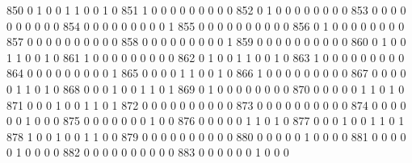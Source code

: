 \documentclass[compress,8pt]{beamer}
\begin{document}
\begin{frame}
\begin{Schunk}
  850      0       1   0              0        1    1       0       0   1   0
  851      1       0   0              0        0    0       0       0   0   0
  852      0       1   0              0        0    0       0       0   0   0
  853      0       0   0              0        0    0       0       0   0   0
  854      0       0   0              0        0    0       0       0   0   1
  855      0       0   0              0        0    0       0       0   0   0
  856      0       1   0              0        0    0       0       0   0   0
  857      0       0   0              0        0    0       0       0   0   0
  858      0       0   0              0        0    0       0       0   0   1
  859      0       0   0              0        0    0       0       0   0   0
  860      0       1   0              0        1    1       0       0   1   0
  861      1       0   0              0        0    0       0       0   0   0
  862      0       1   0              0        1    1       0       0   1   0
  863      1       0   0              0        0    0       0       0   0   0
  864      0       0   0              0        0    0       0       0   0   1
  865      0       0   0              0        1    1       0       0   1   0
  866      1       0   0              0        0    0       0       0   0   0
  867      0       0   0              0        0    1       1       0   1   0
  868      0       0   0              1        0    0       1       1   0   1
  869      0       1   0              0        0    0       0       0   0   0
  870      0       0   0              0        0    1       1       0   1   0
  871      0       0   0              1        0    0       1       1   0   1
  872      0       0   0              0        0    0       0       0   0   0
  873      0       0   0              0        0    0       0       0   0   0
  874      0       0   0              0        0    0       1       0   0   0
  875      0       0   0              0        0    0       0       1   0   0
  876      0       0   0              0        0    1       1       0   1   0
  877      0       0   0              1        0    0       1       1   0   1
  878      1       0   0              1        0    0       1       1   0   0
  879      0       0   0              0        0    0       0       0   0   0
  880      0       0   0              0        0    1       0       0   0   0
  881      0       0   0              0        0    1       0       0   0   0
  882      0       0   0              0        0    0       0       0   0   0
  883      0       0   0              0        0    0       1       0   0   0

\end{Schunk}
\end{frame}
\end{document}
